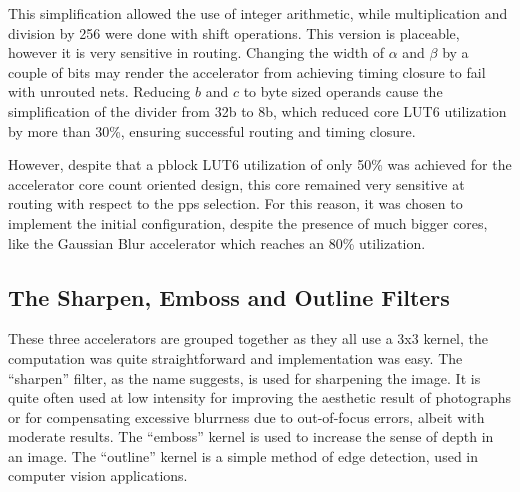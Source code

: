 This simplification allowed the use of integer arithmetic, while multiplication
and division by 256 were done with shift operations. This version is placeable,
however it is very sensitive in routing. 
Changing the width of $\alpha$ and $\beta$ by a couple of bits
may render the accelerator from achieving timing closure to fail with unrouted nets.
Reducing $b$ and $c$ to byte sized operands cause the simplification of the divider
from 32b to 8b, which reduced core LUT6 utilization by more than 30\%, ensuring
successful routing and timing closure.

However, despite that a \gls{pblock} LUT6 utilization of only 50\% was achieved
for the accelerator core count oriented design,
this core remained very sensitive at routing with respect to the \glspl{pp} selection.
For this reason, it was chosen to implement the initial configuration,
despite the presence of much bigger cores, like the Gaussian Blur accelerator
which reaches an 80\% utilization.

\subsection{The Sharpen, Emboss and Outline Filters}

These three accelerators are grouped together as they all use a 3x3 kernel,
the computation was quite straightforward and implementation was easy.
The ``sharpen'' filter, as the name suggests, is used for sharpening the image.
It is quite often used at low intensity for improving the aesthetic result of
photographs or for compensating excessive blurrness due to out-of-focus errors,
albeit with moderate results. 
The ``emboss'' kernel is used to increase the sense of depth in an image.
The ``outline'' kernel is a simple method
of edge detection, used in computer vision applications.


